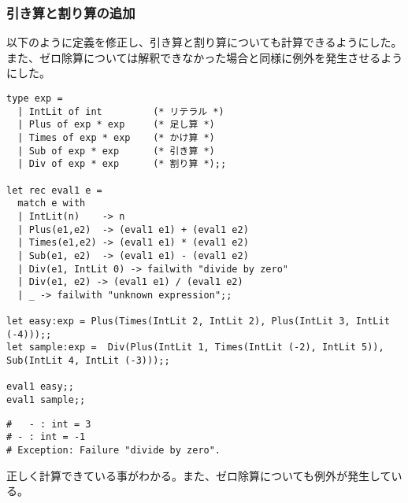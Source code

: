 \documentclass[a4paper,9pt]{jarticle}
\begin{document}
\subsubsection{引き算と割り算の追加}
以下のように定義を修正し、引き算と割り算についても計算できるようにした。
また、ゼロ除算については解釈できなかった場合と同様に例外を発生させるよう
にした。

\begin{lstlisting}
type exp =
  | IntLit of int         (* リテラル *)
  | Plus of exp * exp     (* 足し算 *)
  | Times of exp * exp    (* かけ算 *)
  | Sub of exp * exp      (* 引き算 *)
  | Div of exp * exp      (* 割り算 *);;

let rec eval1 e =
  match e with
  | IntLit(n)    -> n
  | Plus(e1,e2)  -> (eval1 e1) + (eval1 e2)
  | Times(e1,e2) -> (eval1 e1) * (eval1 e2)
  | Sub(e1, e2)  -> (eval1 e1) - (eval1 e2)
  | Div(e1, IntLit 0) -> failwith "divide by zero"
  | Div(e1, e2) -> (eval1 e1) / (eval1 e2)
  | _ -> failwith "unknown expression";;

let easy:exp = Plus(Times(IntLit 2, IntLit 2), Plus(IntLit 3, IntLit (-4)));;
let sample:exp =  Div(Plus(IntLit 1, Times(IntLit (-2), IntLit 5)), Sub(IntLit 4, IntLit (-3)));;

eval1 easy;;
eval1 sample;;
\end{lstlisting}

\begin{lstlisting}[caption=実行結果]
#   - : int = 3
# - : int = -1
# Exception: Failure "divide by zero".
\end{lstlisting}
正しく計算できている事がわかる。また、ゼロ除算についても例外が発生してい
る。
\end{document}
